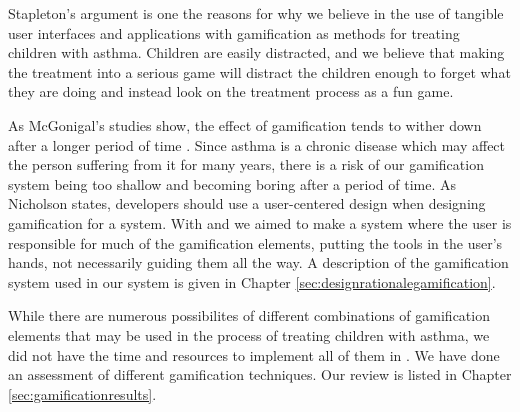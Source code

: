 Stapleton's argument is one the reasons for why we believe in the use of tangible user interfaces and applications with gamification as methods for treating children with asthma. Children are easily distracted, and we believe that making the treatment into a serious game will distract the children enough to forget what they are doing and instead look on the treatment process as a fun game.

As McGonigal's studies show, the effect of gamification tends to wither down after a longer period of time \cite{jane2011reality}. Since asthma is a chronic disease which may affect the person suffering from it for many years, there is a risk of our gamification system being too shallow and becoming boring after a period of time. As Nicholson\cite{nicholson2012user} states, developers should use a user-centered design when designing gamification for a system. With \app{} and \ab{} we aimed to make a system where the user is responsible for much of the gamification elements, putting the tools in the user's hands, not necessarily guiding them all the way. A description of the gamification system used in our system is given in Chapter \ref{sec:designrationalegamification}. 

While there are numerous possibilites of different combinations of gamification elements that may be used in the process of treating children with asthma, we did not have the time and resources to implement all of them in \app{}. We have done an assessment of different gamification techniques. Our review is listed in Chapter \ref{sec:gamificationresults}. 